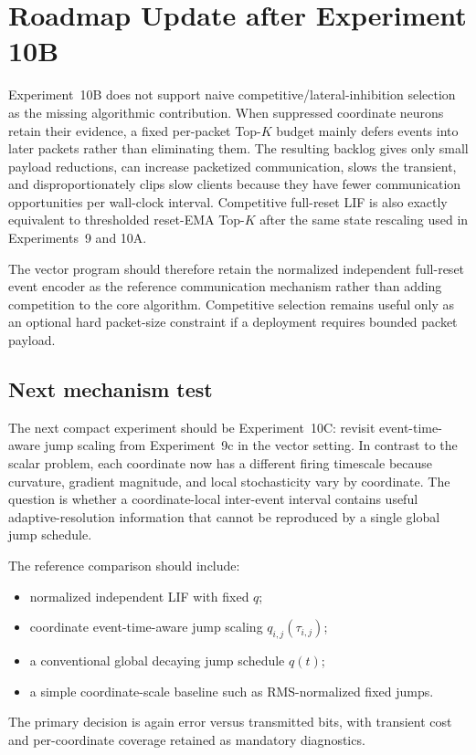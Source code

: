 \section{Roadmap Update after Experiment 10B}

Experiment~10B does not support naive competitive/lateral-inhibition selection as the missing algorithmic contribution. When suppressed coordinate neurons retain their evidence, a fixed per-packet Top-$K$ budget mainly defers events into later packets rather than eliminating them. The resulting backlog gives only small payload reductions, can increase packetized communication, slows the transient, and disproportionately clips slow clients because they have fewer communication opportunities per wall-clock interval. Competitive full-reset LIF is also exactly equivalent to thresholded reset-EMA Top-$K$ after the same state rescaling used in Experiments~9 and 10A.

The vector program should therefore retain the normalized independent full-reset event encoder as the reference communication mechanism rather than adding competition to the core algorithm. Competitive selection remains useful only as an optional hard packet-size constraint if a deployment requires bounded packet payload.

\subsection{Next mechanism test}

The next compact experiment should be Experiment~10C: revisit event-time-aware jump scaling from Experiment~9c in the vector setting. In contrast to the scalar problem, each coordinate now has a different firing timescale because curvature, gradient magnitude, and local stochasticity vary by coordinate. The question is whether a coordinate-local inter-event interval contains useful adaptive-resolution information that cannot be reproduced by a single global jump schedule.

The reference comparison should include:
\begin{itemize}
  \item normalized independent LIF with fixed $q$;
  \item coordinate event-time-aware jump scaling $q_{i,j}(\tau_{i,j})$;
  \item a conventional global decaying jump schedule $q(t)$;
  \item a simple coordinate-scale baseline such as RMS-normalized fixed jumps.
\end{itemize}
The primary decision is again error versus transmitted bits, with transient cost and per-coordinate coverage retained as mandatory diagnostics.


